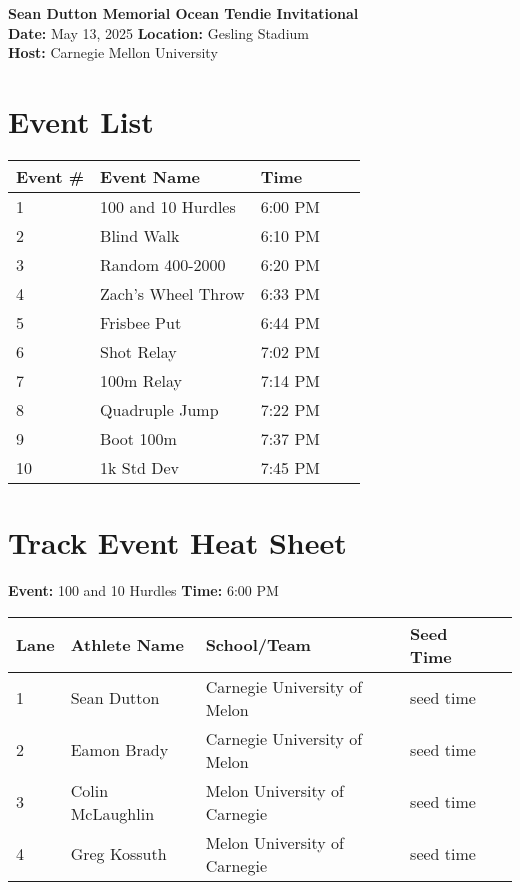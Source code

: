 \documentclass[11pt]{article}
\begin{document}
\begin{center}
    \LARGE \textbf{Sean Dutton Memorial Ocean Tendie Invitational} \\
    \large
    \vspace{0.5em}
    \textbf{Date:} May 13, 2025 \hspace{2cm} \textbf{Location:} Gesling Stadium \\
    \textbf{Host:} Carnegie Mellon University
\end{center}

\vspace{1em}

\section*{Event List}

\begin{tabular}{@{}lllll@{}}
\toprule
\textbf{Event \#} & \textbf{Event Name} &  \textbf{Time} \\
\midrule
1 & 100 and 10 Hurdles & 6:00 PM \\
2 & Blind Walk & 6:10 PM \\
3 & Random 400-2000 & 6:20 PM \\
4 & Zach's Wheel Throw & 6:33 PM \\
5 & Frisbee Put & 6:44 PM \\
6 & Shot Relay & 7:02 PM \\
7 & 100m Relay & 7:14 PM \\
8 & Quadruple Jump & 7:22 PM \\
9 & Boot 100m & 7:37 PM \\
10 & 1k Std Dev & 7:45 PM \\
\bottomrule
\end{tabular}



\vspace{2em}

\section*{Track Event Heat Sheet}


\textbf{Event:} 100 and 10 Hurdles \quad \textbf{Time:} 6:00 PM 

\vspace{1em}
\begin{tabular}{@{}lllll@{}}
\toprule
\textbf{Lane} & \textbf{Athlete Name} & \textbf{School/Team} & \textbf{Seed Time} \\
\midrule
1 & Sean Dutton & Carnegie University of Melon & seed time &\\
2 & Eamon Brady & Carnegie University of Melon & seed time &\\
3 & Colin McLaughlin & Melon University of Carnegie & seed time &\\
4 & Greg Kossuth & Melon University of Carnegie & seed time &\\
\bottomrule
\end{tabular}
\vspace{2.5em}
\end{document}
